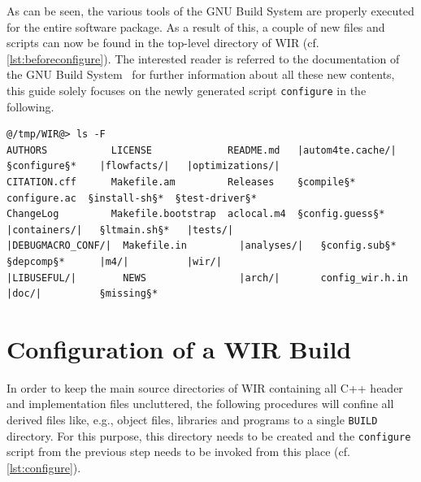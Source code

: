 As can be seen, the various tools of the GNU Build System are properly executed for the entire software package.
As a result of this, a couple of new files and scripts can now be found in the top-level directory of \gls{WIR} (cf. \cref{lst:beforeconfigure}).
The interested reader is referred to the documentation of the GNU Build System~\cite{gnubuild26} for further information about all these new contents, this guide solely focuses on the newly generated script \texttt{configure} in the following.

\begin{lstlisting}[style=commandline,float=ht,caption={Directory Listing After \texttt{automake}, \texttt{autoconf} and Friends},label=lst:beforeconfigure]
@/tmp/WIR@> ls -F
AUTHORS           LICENSE             README.md   |autom4te.cache/|  §configure§*    |flowfacts/|   |optimizations/|
CITATION.cff      Makefile.am         Releases    §compile§*         configure.ac  §install-sh§*  §test-driver§*
ChangeLog         Makefile.bootstrap  aclocal.m4  §config.guess§*    |containers/|   §ltmain.sh§*   |tests/|
|DEBUGMACRO_CONF/|  Makefile.in         |analyses/|   §config.sub§*      §depcomp§*      |m4/|          |wir/|
|LIBUSEFUL/|        NEWS                |arch/|       config_wir.h.in  |doc/|          §missing§*
\end{lstlisting}


\section{Configuration of a WIR Build}
\label{sec:configure}

In order to keep the main source directories of \gls{WIR} containing all C++ header and implementation files uncluttered, the following procedures will confine all derived files like, e.g., object files, libraries and programs to a single \texttt{BUILD} directory.
For this purpose, this directory needs to be created and the \texttt{configure} script from the previous step needs to be invoked from this place (cf. \cref{lst:configure}).

